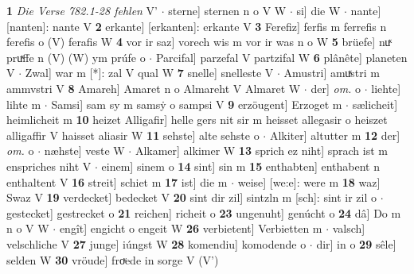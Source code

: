 \documentclass[8pt,a4paper,notitlepage]{article}
\begin{document}
\begin{table}[ht]
\begin{minipage}[t]{0.5\linewidth}
\textbf{1} \textit{Die Verse 782.1-28 fehlen} V'   $\cdot$ sterne] sternen n o V W  $\cdot$ si] die W  $\cdot$ nante] [nanten]: nante V \textbf{2} erkante] [erkanten]: erkante V \textbf{3} Ferefiz] ferfis m ferrefis n ferefis o (V) ferafis W \textbf{4} vor ir saz] vorech wis m vor ir was n o W \textbf{5} brüefe] nuͯ pruͯffe n (V) (W) ym prúfe o  $\cdot$ Parcifal] parzefal V partzifal W \textbf{6} plânête] planeten V  $\cdot$ Zwal] war m [*]: zal V qual W \textbf{7} snelle] snelleste V  $\cdot$ Amustri] amuͯstri m ammvstri V \textbf{8} Amareh] Amaret n o Almareht V Almaret W  $\cdot$ der] \textit{om.} o  $\cdot$ liehte] lihte m  $\cdot$ Samsi] sam sy m samsẏ o sampsi V \textbf{9} erzöugent] Erzoget m  $\cdot$ sælicheit] heimlicheit m \textbf{10} heizet Alligafir] helle gers nit sir m heisset allegasir o heiszet alligaffir V haisset aliasir W \textbf{11} sehste] alte sehste o  $\cdot$ Alkiter] altutter m \textbf{12} der] \textit{om.} o  $\cdot$ næhste] veste W  $\cdot$ Alkamer] alkimer W \textbf{13} sprich ez niht] sprach ist m enspriches niht V  $\cdot$ einem] sinem o \textbf{14} sint] sin m \textbf{15} enthabten] enthabent n enthaltent V \textbf{16} streit] schiet m \textbf{17} ist] die m  $\cdot$ weise] [we:e]: were m \textbf{18} waz] Swaz V \textbf{19} verdecket] bedecket V \textbf{20} sint dir zil] sintzln m [sch]: sint ir zil o  $\cdot$ gestecket] gestrecket o \textbf{21} reichen] richeit o \textbf{23} ungenuht] genúcht o \textbf{24} dâ] Do m n o V W  $\cdot$ engît] engicht o engeit W \textbf{26} verbietent] Verbietten m  $\cdot$ valsch] velschliche V \textbf{27} junge] iúngst W \textbf{28} komendiu] komodende o  $\cdot$ dir] in o \textbf{29} sêle] selden W \textbf{30} vröude] froͮede in sorge V (V') \newline
\end{minipage}
\end{table}
\newpage
\end{document}
